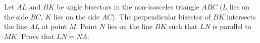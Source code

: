 Let $AL$ and $BK$ be angle bisectors in the non-isosceles triangle $ABC$ ($L$ lies on the side $BC$, $K$ lies on the side $AC$). The perpendicular bisector of $BK$ intersects the line $AL$ at point $M$. Point $N$ lies on the line $BK$ such that $LN$ is parallel to $MK$. Prove that $LN = NA$.